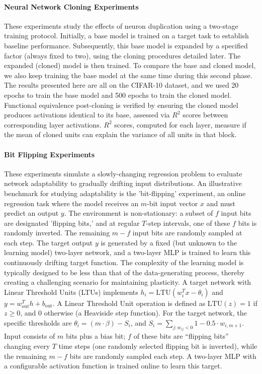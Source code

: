 \documentclass{article}
\numberwithin{figure}{section}
\begin{document}
\paragraph{Neural Network Cloning Experiments}
These experiments study the effects of neuron duplication using a two-stage training protocol. Initially, a base model is trained on a target task to establish baseline performance. Subsequently, this base model is expanded by a specified factor (always fixed to two), using the cloning procedures detailed later. The expanded (cloned) model is then trained. To compare the base and cloned model, we also keep training the base model at the same time during this second phase. The results presented here are all on the CIFAR-10 dataset, and we used 20 epochs to train the base model and 500 epochs to train the cloned model. Functional equivalence post-cloning is verified by ensuring the cloned model produces activations identical to its base, assessed via $R^2$ scores between corresponding layer activations. $R^2$ scores, computed for each layer, measure if the mean of cloned units can explain the variance of all units in that block. 

\paragraph{Bit Flipping Experiments}
These experiments simulate a slowly-changing regression problem to evaluate network adaptability to gradually drifting input distributions. An illustrative benchmark for studying adaptability is the 'bit-flipping' experiment, an online regression task where the model receives an $m$-bit input vector $x$ and must predict an output $y$. The environment is non-stationary: a subset of $f$ input bits are designated 'flipping bits,' and at regular $T$-step intervals, one of these $f$ bits is randomly inverted. The remaining $m-f$ input bits are randomly sampled at each step. The target output $y$ is generated by a fixed (but unknown to the learning model) two-layer network, and a two-layer MLP is trained to learn this continuously drifting target function. The complexity of the learning model is typically designed to be less than that of the data-generating process, thereby creating a challenging scenario for maintaining plasticity. A target network with Linear Threshold Units (LTUs) implements $h_i = \text{LTU}(w_i^T x - \theta_i)$ and $y = w_{\text{out}}^T h + b_{\text{out}}$. A Linear Threshold Unit operation is defined as $\text{LTU}(z) = 1$ if $z \ge 0$, and $0$ otherwise (a Heaviside step function). For the target network, the specific thresholds are $\theta_i = (m \cdot \beta) - S_i$, and $S_i = \sum_{j: w_{ij} < 0} 1 - 0.5 \cdot w_{i,m+1}$. Input consists of $m$ bits plus a bias bit; $f$ of these bits are ``flipping bits'' changing every $T$ time steps (one randomly selected flipping bit is inverted), while the remaining $m-f$ bits are randomly sampled each step. A two-layer MLP with a configurable activation function is trained online to learn this target.
\end{document}
